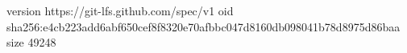 version https://git-lfs.github.com/spec/v1
oid sha256:e4cb223add6abf650cef8f8320e70afbbc047d8160db098041b78d8975d86baa
size 49248
